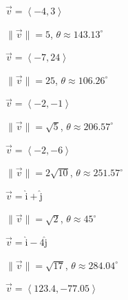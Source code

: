 \documentclass{ximera}
\begin{document}
\begin{question}
\begin{problem}
$\overrightarrow{v} = \left<-4, 3 \right>$

\begin{solution}
$\|\overrightarrow{v}\| = 5$, $\theta \approx 143.13^{\circ}$
\end{solution}
\end{problem}

\begin{problem}
$\overrightarrow{v} = \left<-7, 24\right>$

\begin{solution}
$\|\overrightarrow{v}\| = 25$, $\theta \approx 106.26^{\circ}$
\end{solution}
\end{problem}

\begin{problem}
$\overrightarrow{v} = \left<-2, -1 \right>$

\begin{solution}
$\|\overrightarrow{v}\| = \sqrt{5}$, $\theta \approx 206.57^{\circ}$
\end{solution}
\end{problem}

\begin{problem}
$\overrightarrow{v} = \left<-2, -6\right>$

\begin{solution}
$\|\overrightarrow{v}\| = 2\sqrt{10}$, $\theta \approx 251.57^{\circ}$
\end{solution}
\end{problem}

\begin{problem}
$\overrightarrow{v} = \hat{\text{i}} + \hat{\text{j}}$

\begin{solution}
$\|\overrightarrow{v}\| = \sqrt{2}$, $\theta \approx 45^{\circ}$
\end{solution}
\end{problem}

\begin{problem}
$\overrightarrow{v} = \hat{\text{i}} - 4\hat{\text{j}}$

\begin{solution}
$\|\overrightarrow{v}\| = \sqrt{17}$, $\theta \approx 284.04^{\circ}$
\end{solution}
\end{problem}

\begin{problem}
$\overrightarrow{v} = \left<123.4, -77.05\right>$


\end{problem}
\end{question}
\end{document}

